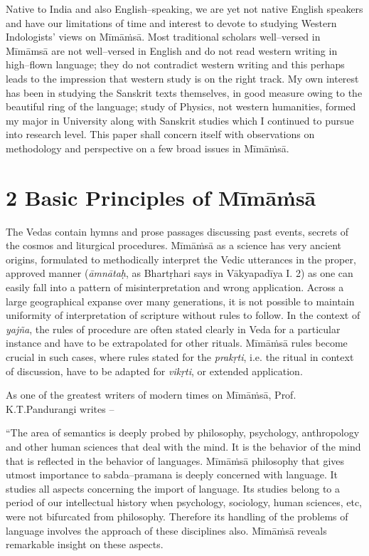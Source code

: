 Native to India and also English–speaking, we are yet not native English speakers and have our limitations of time and interest to devote to studying Western Indologists’ views on Mīmāṁsā. Most traditional scholars well–versed in Mīmāmsā are not well–versed in English and do not read western writing in high–flown language; they do not contradict western writing and this perhaps leads to the impression that western study is on the right track. My own interest has been in studying the Sanskrit texts themselves, in good measure owing to the beautiful ring of the language; study of Physics, not western humanities, formed my major in University along with Sanskrit studies which I continued to pursue into research level. This paper shall concern itself with observations on methodology and perspective on a few broad issues in Mīmāṁsā.


\section*{2 Basic Principles of Mīmāṁsā}

The Vedas contain hymns and prose passages discussing past events, secrets of the cosmos and liturgical procedures. Mīmāṁsā as a science has very ancient origins, formulated to methodically interpret the Vedic utterances in the proper, approved manner (\textit{āmnātaḥ}, as Bhartṛhari says in Vākyapadīya I. 2) as one can easily fall into a pattern of misinterpretation and wrong application. Across a large geographical expanse over many generations, it is not possible to maintain uniformity of interpretation of scripture without rules to follow. In the context of \textit{yajña}, the rules of procedure are often stated clearly in Veda for a particular instance and have to be extrapolated for other rituals. Mīmāṁsā rules become crucial in such cases, where rules stated for the \textit{prakṛti}, i.e. the ritual in context of discussion, have to be adapted for \textit{vikṛti}, or extended application.

As one of the greatest writers of modern times on Mīmāṁsā, Prof. K.T.Pandurangi writes –

\begin{myquote}
“The area of semantics is deeply probed by philosophy, psychology, anthropology and other human sciences that deal with the mind. It is the behavior of the mind that is reflected in the behavior of languages. Mīmāṁsā philosophy that gives utmost importance to sabda–pramana is deeply concerned with language. It studies all aspects concerning the import of language. Its studies belong to a period of our intellectual history when psychology, sociology, human sciences, etc, were not bifurcated from philosophy. Therefore its handling of the problems of language involves the approach of these disciplines also. Mīmāṁsā reveals remarkable insight on these aspects.
\end{myquote}

